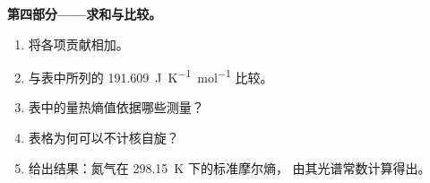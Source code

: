 \begin{problem}
\medskip\noindent\textbf{第四部分——求和与比较。}
\begin{enumerate}[resume]
  \item 将各项贡献相加。
  \item 与表中所列的 \qty{191.609}{J.K^{-1}.mol^{-1}} 比较。
  \item 表中的量热熵值依据哪些测量？
  \item 表格为何可以不计核自旋？
  \item 给出结果：氮气在 \qty{298.15}{K} 下的标准摩尔熵，
        由其光谱常数计算得出。
\end{enumerate}
\end{problem}
